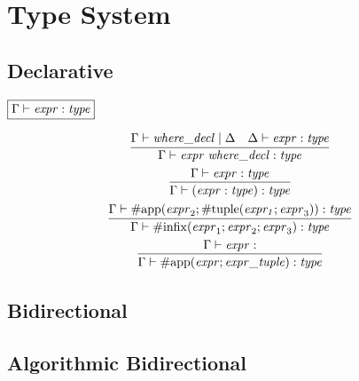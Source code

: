 \section{Type System}

\subsection{Declarative}

$\fbox{$\Gamma \vdash \mathit{expr}: \mathit{type}$}$

\begin{gather*}
    \infer{\Gamma \vdash \mathit{expr}\; \mathit{where\_decl}: \mathit{type}}{
        \Gamma \vdash \mathit{where\_decl} \mid \Delta
        &
        \Delta \vdash \mathit{expr}: \mathit{type}
    }
    \\
    \infer{\Gamma \vdash (\mathit{expr}: \mathit{type}): \mathit{type}}{
        \Gamma \vdash \mathit{expr}: \mathit{type}
    }
    \\
    \infer{\Gamma \vdash \mathrm{\#infix}(\mathit{expr}_1; \mathit{expr}_2; \mathit{expr}_3): \mathit{type}}{
        \Gamma \vdash \mathrm{\#app}(\mathit{expr}_2; \mathrm{\#tuple}(\mathit{expr_1}; \mathit{expr}_3)): \mathit{type}
    }
    \\
    \infer{\Gamma \vdash \mathrm{\#app}(\mathit{expr}; \mathit{expr\_tuple}): \mathit{type}}{
        \Gamma \vdash \mathit{expr}:
    }
\end{gather*}

\subsection{Bidirectional}

\subsection{Algorithmic Bidirectional}
